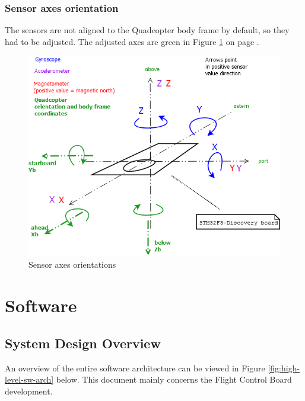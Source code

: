 \documentclass[a4paper]{report}
\begin{document}
	\subsection{Sensor axes orientation}
The sensors are not aligned to the Quadcopter body frame by default, so they had to be adjusted. The adjusted axes are green in Figure \ref{fig:sensor_axes_orientation} on page \pageref{fig:sensor_axes_orientation}.
\begin{figure}
    \centering
    \includegraphics[width=\textwidth]{images/CoordinateFrames.png}
   \caption{Sensor axes orientations}
   \label{fig:sensor_axes_orientation}
\end{figure}

\chapter{Software}

	\section{System Design Overview}
An overview of the entire software architecture can be viewed in Figure \ref{fig:high-level-sw-arch} below. This document mainly concerns the Flight Control Board development.
\end{document}
